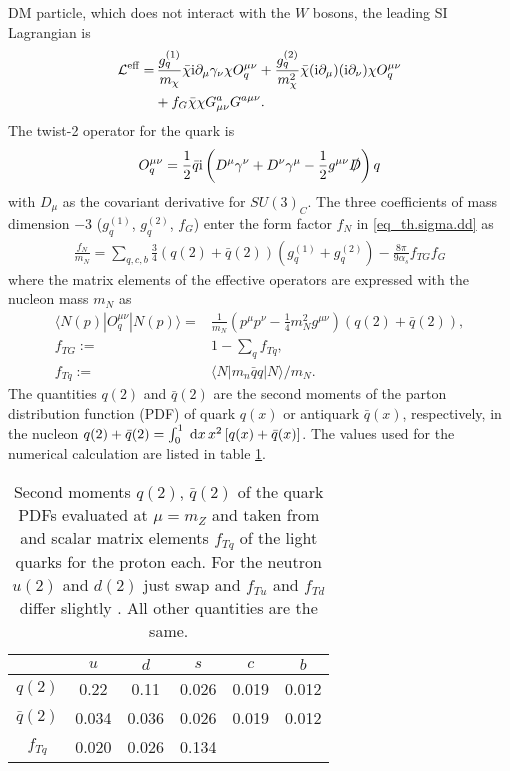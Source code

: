 DM particle, which does not interact with the $W$ bosons, the leading SI Lagrangian is
\begin{align}
 \mathcal{L}^\text{eff} =&\, \frac{g_q^{(1)}}{m_\chi} \bar \chi\text{i} \partial_\mu \gamma_\nu\chi O_q^{\mu\nu} + \frac{g_q^{(2)}}{m^2_\chi} \bar \chi(\text{i} \partial_\mu) (\text{i}\partial_\nu)\chi O_q^{\mu\nu} \\
 \nonumber
 &+ f_G \bar \chi \chi G^a_{\mu\nu} G^{a\mu\nu}.
\end{align}
The twist-2 operator for the quark is
\begin{align}
 O_q^{\mu\nu} = \frac12 \bar q \text{i} \left(D^\mu \gamma^\nu + D^\nu \gamma^\mu - \frac12 g^{\mu\nu} \slashed{D}\right) q
\end{align}
with $D_\mu$ as the covariant derivative for $SU(3)_C$. The three coefficients of mass dimension $-3$ ($g_q^{(1)}$, $g_q^{(2)}$, $f_G$) enter 
the form factor $f_N$ in \eqref{eq_th.sigma.dd} as
\begin{align}
 \frac{f_N}{m_N} = \sum\limits_{q,c,b} \frac34 \left(q(2)+\bar q(2)\right) \left(g_q^{(1)} + g_q^{(2)}\right) - \frac{8\pi}{9\alpha_s}f_{TG}f_G
 \label{eq_ddformfactorA}
\end{align}
where the matrix elements of the effective operators are expressed with the nucleon mass $m_N$ as \cite{1007.2601}
\begin{subequations}
\begin{align}
 \langle N(p)| O_q^{\mu\nu} | N(p)\rangle =& \frac{1}{m_N}\left(p^\mu p^\nu - \frac14 m_N^2 g^{\mu\nu}\right) \left(q(2) + \bar q(2)\right),\\
 f_{TG} :=& 1- \sum\limits_q f_{Tq},\\
 f_{Tq} :=& \langle N|m_n \bar qq |N\rangle /m_N.
\end{align}
\end{subequations}
The quantities $q(2)$ and $\bar q(2)$ are the second moments \cite{0811.1779} of the parton distribution function (PDF) of quark $q(x)$ or antiquark 
$\bar q(x)$, respectively, in the nucleon $q(2)+\bar q(2) = \int_0^1 \; \mathrm{d} x\, x^2 \left[q(x) + \bar q(x)\right]$. The values used for the numerical
calculation are listed in table \ref{tab_parton}.
\begin{table}[b]
 \begin{tabular}{c|ccccc}
   & $u$ & $d$ & $s$ & $c$ &$b$ \\
   \hline
  $q(2)$ & 0.22 & 0.11 & 0.026 & 0.019 & 0.012\\
  $\bar q(2)$ & 0.034 & 0.036 & 0.026 & 0.019 & 0.012\\
  $f_{Tq}$ & 0.020& 0.026 &\hspace{0.47cm}  0.134\cite{1209.3641}\\
 \end{tabular}
\caption{Second moments $q(2)$, $\bar q(2)$ of the quark PDFs evaluated at $\mu=m_Z$ and taken from \cite{0201195} and scalar matrix elements $f_{Tq}$ of 
the light quarks for the 
proton each. For the neutron $u(2)$ and $d(2)$ just swap and $f_{Tu}$ and $f_{Td}$ differ slightly \cite{9506380}. All other quantities are the same. }
\label{tab_parton}
\end{table}
